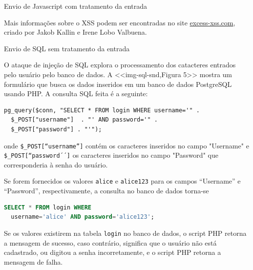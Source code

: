 \begin{frame}{}{Envio de Javascript com tratamento da entrada}

Mais informações sobre o XSS podem ser encontradas no site
\href{http://excess-xss.com}{excess-xss.com}, criado por Jakob Kallin e Irene
Lobo Valbuena.

\end{frame}


\begin{frame}[fragile]{}{Envio de SQL sem tratamento da entrada}

O ataque de injeção de SQL explora o processamento dos catacteres entrados pelo usuário pelo 
 banco de dados. A <<img-sql-snd,Figura 5>> mostra um formulário que busca os dados inseridos 
em um banco de dados PostgreSQL usando PHP. A consulta SQL feita é a seguinte:

{\small
\begin{verbatim}
pg_query($conn, "SELECT * FROM login WHERE username='" . 
  $_POST["username"]  . "' AND password='" . 
  $_POST["password"] . "'");
\end{verbatim}
}

onde {\tt \$\_POST[``username'']} contém os caracteres
inseridos no campo "Username" e {\tt \$\_POST[``password´´]} os
caracteres inseridos no campo "Password" que corresponderia à senha
do usuário.

\end{frame}

\begin{frame}[fragile]{}

Se forem fornecidos os valores {\tt alice} e {\tt alice123} para os
campos ``Username'' e ``Password'', respectivamente, a consulta no
banco de dados torna-se

\begin{lstlisting}[language=SQL]
SELECT * FROM login WHERE 
  username='alice' AND password='alice123';
\end{lstlisting}

\end{frame}

\begin{frame}{}

  Se os valores existirem na tabela {\tt login} no banco de dados, o
script PHP retorna a mensagem de sucesso, caso contrário, significa
que o usuário não está cadastrado, ou digitou a senha incorretamente,
e o script PHP retorna a mensagem de falha.
\end{frame}

